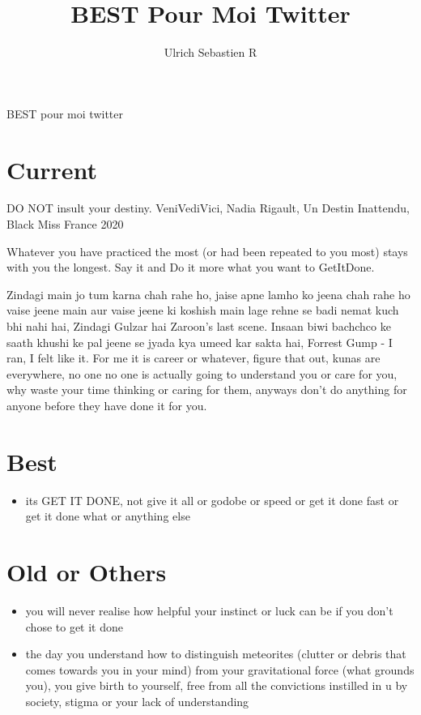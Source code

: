 \documentclass{article}
\author {Ulrich Sebastien R}
\title {\Large{\textbf{BEST Pour Moi Twitter}}}
\begin{document}
\maketitle    

BEST pour moi twitter

\section{Current}
\item DO NOT insult your destiny. VeniVediVici, Nadia Rigault, Un Destin Inattendu, Black Miss France 2020
\item Whatever you have practiced the most (or had been repeated to you most) stays with you the longest. Say it and Do it more what you want to GetItDone.
\item Zindagi main jo tum karna chah rahe ho, jaise apne lamho ko jeena chah rahe ho vaise jeene main aur vaise jeene ki koshish main lage rehne se badi nemat kuch bhi nahi hai, Zindagi Gulzar hai Zaroon's last scene. Insaan biwi bachchco ke saath khushi ke pal jeene se jyada kya umeed kar sakta hai, Forrest Gump - I ran, I felt like it. For me it is career or whatever, figure that out, kunas are everywhere, no one no one is actually going to understand you or care for you, why waste your time thinking or caring for them, anyways don't do anything for anyone before they have done it for you. 

\section{Best}

\begin{itemize}
\item its GET IT DONE, not give it all or godobe or speed or get it done fast or get it done what or anything else

\end{itemize}

\section{Old or Others}
\begin{itemize}
\item you will never realise how helpful your instinct or luck can be if you don't chose to get it done
\item the day you understand how to distinguish meteorites (clutter or debris that comes towards you in your mind) from your gravitational force (what grounds you), you give birth to yourself, free from all the convictions instilled in u by society, stigma or your lack of understanding
\end{itemize}
\end{document}
